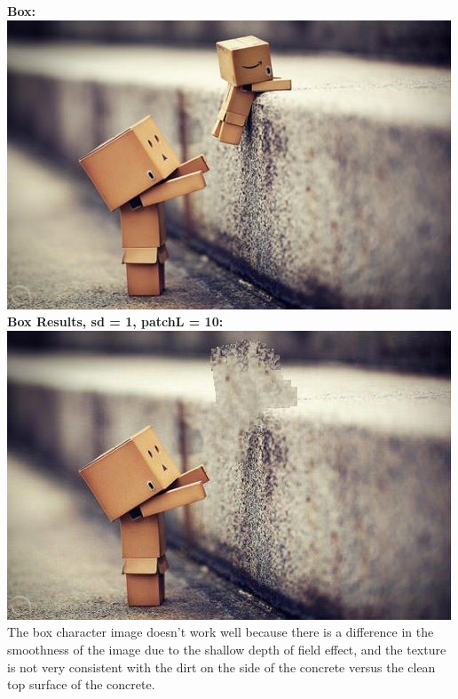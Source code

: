 \documentclass[]{article}
\begin{document}
\textbf{Box:}\\
	\includegraphics[width=0.7\linewidth]{box.jpg}
	\label{fig:box}\\
\textbf{Box Results, sd = 1, patchL = 10:}\\
	\includegraphics[width=0.7\linewidth]{box_results.jpg}
	\label{fig:boxresults}\\
The box character image doesn't work well because there is a difference in the smoothness of the image due to the shallow depth of field effect, and the texture is not very consistent with the dirt on the side of the concrete versus the clean top surface of the concrete.
\end{document}
